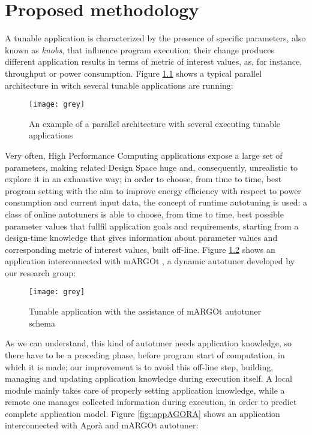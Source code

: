 \chapter{Proposed methodology}

\lettrine{A}{} tunable application is characterized by the presence of specific parameters, also known as \textit{knobs}, that influence program execution; their change produces different application results in terms of metric of interest values, as, for instance, throughput or power consumption. Figure \ref{fig::appDef} shows a typical parallel architecture in witch several tunable applications are running:

\begin{figure}[H]

    \centering
    \texttt{[image: grey]}
    \caption{An example of a parallel architecture with several executing tunable applications}
    \label{fig::appDef}
    
\end{figure}

Very often, High Performance Computing applications expose a large set of parameters, making related Design Space huge and, consequently, unrealistic to explore it in an exhaustive way; in order to choose, from time to time, best program setting with the aim to improve energy efficiency with respect to power consumption and current input data, the concept of runtime autotuning is used: a class of online autotuners is able to choose, from time to time, best possible parameter values that fullfil application goals and requirements, starting from a design-time knowledge that gives information about parameter values and corresponding metric of interest values, built off-line. Figure \ref{fig::appAut} shows an application interconnected with mARGOt \cite{gadioli2015application}, a dynamic autotuner developed by our research group:

\begin{figure}[H]

    \centering
    \texttt{[image: grey]}
    \caption{Tunable application with the assistance of mARGOt autotuner schema}
    \label{fig::appAut}
    
\end{figure}

As we can understand, this kind of autotuner needs application knowledge, so there have to be a preceding phase, before program start of computation, in which it is made; our improvement is to avoid this off-line step, building, managing and updating application knowledge during execution itself. A local module mainly takes care of properly setting application knowledge, while a remote one manages collected information during execution, in order to predict complete application model. Figure \ref{fig::appAGORA} shows an application interconnected with Agorà and mARGOt autotuner:

